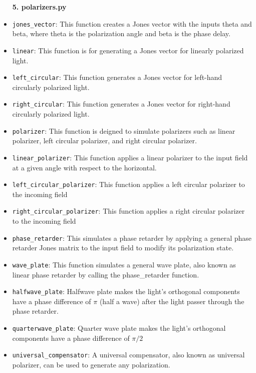 \documentclass[a4paper,12pt]{report}
\begin{document}
\begin{itemize}
    \vspace{1em}
    {\large \textbf{5. polarizers.py}}
    \item \texttt{jones\_vector}: This function creates a Jones vector with the inputs theta and beta, where theta is the polarization angle and beta is the phase delay.
    \item \texttt{linear}: This function is for generating a Jones vector for linearly polarized light.
    \item \texttt{left\_circular}: This function generates a Jones vector for left-hand circularly polarized light.
    \item \texttt{right\_circular}: This function generates a Jones vector for right-hand circularly polarized light.
    \item \texttt{polarizer}: This function is deigned to simulate polarizers such as linear polarizer, left circular polarizer, and right circular polarizer.
    \item \texttt{linear\_polarizer}: This function applies a linear polarizer to the input field at a given angle with respect to the horizontal.
    \item \texttt{left\_circular\_polarizer}: This function applies a left circular polarizer to the incoming field
    \item \texttt{right\_circular\_polarizer}: This function applies a right circular polarizer to the incoming field
    \item \texttt{phase\_retarder}: This simulates a phase retarder by applying a general phase retarder Jones matrix to the input field to modify its polarization state.
    \item \texttt{wave\_plate}: This function simulates a general wave plate, also known as linear phase retarder by calling the phase\_retarder function.
    \item \texttt{halfwave\_plate}: Halfwave plate makes the light's orthogonal components have a phase difference of $\pi$ (half a wave) after the light passer through the phase retarder.
    \item \texttt{quarterwave\_plate}: Quarter wave plate makes the light's orthogonal components have a phase difference of $\pi/2$
    \item \texttt{universal\_compensator}: A universal compensator, also known as universal polarizer, can be used to generate any polarization.
    

\end{itemize}
\end{document}
